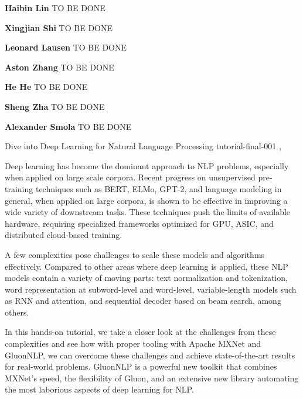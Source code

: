 \begin{bio}

\textbf{Haibin Lin} TO BE DONE

\textbf{Xingjian Shi} TO BE DONE 

\textbf{Leonard Lausen} TO BE DONE 

\textbf{Aston Zhang} TO BE DONE

\textbf{He He} TO BE DONE

\textbf{Sheng Zha} TO BE DONE

\textbf{Alexander Smola} TO BE DONE

\end{bio}

\begin{tutorial}
  {Dive into Deep Learning for Natural Language Processing}
  {tutorial-final-001}
  {\daydateyear, \tutorialmorningtime}
  {\TutLocA}

Deep learning has become the dominant approach to NLP problems, especially when applied on large scale corpora. Recent progress on unsupervised pre-training techniques such as BERT, ELMo, GPT-2, and language modeling in general, when applied on large corpora, is shown to be effective in improving a wide variety of downstream tasks. These techniques push the limits of available hardware, requiring specialized frameworks optimized for GPU, ASIC, and distributed cloud-based training.

A few complexities pose challenges to scale these models and algorithms effectively. Compared to other areas where deep learning is applied, these NLP models contain a variety of moving parts: text normalization and tokenization, word representation at subword-level and word-level, variable-length models such as RNN and attention, and sequential decoder based on beam search, among others.

In this hands-on tutorial, we take a closer look at the challenges from these complexities and see how with proper tooling with Apache MXNet and GluonNLP, we can overcome these challenges and achieve state-of-the-art results for real-world problems. GluonNLP is a powerful new toolkit that combines MXNet’s speed, the flexibility of Gluon, and an extensive new library automating the most laborious aspects of deep learning for NLP.

\end{tutorial}

